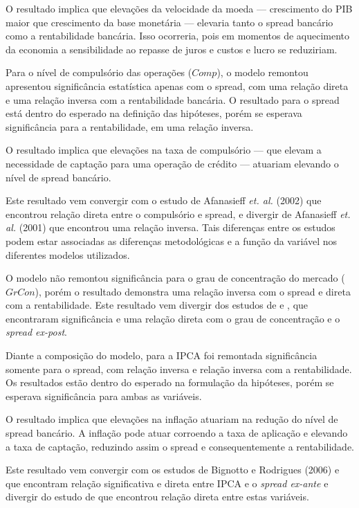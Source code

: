 \documentclass[
  12pt,
  12pt,
  openright,
  oneside,
  a4paper,
  chapter=TITLE,
  section=TITLE,
  subsection=TITLE,
  subsubsection=TITLE,
  english,
  portugues,
  sumario=tradicional]{abntex2}
\begin{document}
O resultado implica que elevações da velocidade da moeda --- crescimento do PIB maior que crescimento da base monetária --- elevaria tanto o spread bancário como a rentabilidade bancária. Isso ocorreria, pois em momentos de aquecimento da economia a sensibilidade ao repasse de juros e custos e lucro se reduziriam.

Para o nível de compulsório das operações (\(Comp\)), o modelo remontou apresentou significância estatística apenas com o spread, com uma relação direta e uma relação inversa com a rentabilidade bancária. O resultado para o spread está dentro do esperado na definição das hipóteses, porém se esperava significância para a rentabilidade, em uma relação inversa.

O resultado implica que elevações na taxa de compulsório --- que elevam a necessidade de captação para uma operação de crédito --- atuariam elevando o nível de spread bancário.

Este resultado vem convergir com o estudo de Afanasieff \emph{et. al.} (2002) que encontrou relação direta entre o compulsório e spread, e divergir de Afanasieff \emph{et. al.} (2001) que encontrou uma relação inversa. Tais diferenças entre os estudos podem estar associadas as diferenças metodológicas e a função da variável nos diferentes modelos utilizados.

O modelo não remontou significância para o grau de concentração do mercado (\(GrCon\)), porém o resultado demonstra uma relação inversa com o spread e direta com a rentabilidade. Este resultado vem divergir dos estudos de \textcite{dantas:2012} e \textcite{almeida:2013}, que encontraram significância e uma relação direta com o grau de concentração e o \emph{spread ex-post}.

Diante a composição do modelo, para a IPCA foi remontada significância somente para o spread, com relação inversa e relação inversa com a rentabilidade. Os resultados estão dentro do esperado na formulação da hipóteses, porém se esperava significância para ambas as variáveis.

O resultado implica que elevações na inflação atuariam na redução do nível de spread bancário. A inflação pode atuar corroendo a taxa de aplicação e elevando a taxa de captação, reduzindo assim o spread e consequentemente a rentabilidade.

Este resultado vem convergir com os estudos de Bignotto e Rodrigues (2006) e \textcite{durigan:2018} que encontram relação significativa e direta entre IPCA e o \emph{spread ex-ante} e divergir do estudo de \textcite{aronovich:1994} que encontrou relação direta entre estas variáveis.
\end{document}
